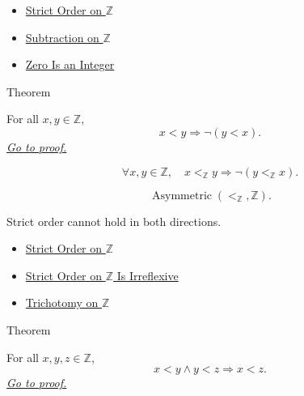 \begin{dependencies}
\begin{itemize}
  \item \hyperref[def:strict-order-on-z]{Strict Order on $\mathbb{Z}$}
  \item \hyperref[def:subtraction-on-z]{Subtraction on $\mathbb{Z}$}
  \item \hyperref[thm:zero-is-an-integer]{Zero Is an Integer}
\end{itemize}
\end{dependencies}

\begin{theorembox}{Theorem}
\begin{theorem}
\label{thm:strict-order-on-z-asymmetric}
For all $x,y\in\mathbb{Z}$,
\[
x<y \Longrightarrow \neg(y<x).
\]
\hyperref[prf:strict-order-on-z-asymmetric]{\textit{Go to proof.}}
\end{theorem}
\end{theorembox}

\begin{remark*}
\[
\forall x,y\in\mathbb{Z},\quad
x<_{\mathbb{Z}}y \Longrightarrow \neg(y<_{\mathbb{Z}}x).
\]
\end{remark*}

\begin{remark*}
\[
\operatorname{Asymmetric}(<_{\mathbb{Z}},\mathbb{Z}).
\]
\end{remark*}

\begin{remark*}[Interpretation]
Strict order cannot hold in both directions.
\end{remark*}

\begin{dependencies}
\begin{itemize}
  \item \hyperref[def:strict-order-on-z]{Strict Order on $\mathbb{Z}$}
  \item \hyperref[thm:strict-order-on-z-irreflexive]{Strict Order on $\mathbb{Z}$ Is Irreflexive}
  \item \hyperref[thm:trichotomy-on-z]{Trichotomy on $\mathbb{Z}$}
\end{itemize}
\end{dependencies}

\begin{theorembox}{Theorem}
\begin{theorem}
\label{thm:strict-order-on-z-transitive}
For all $x,y,z\in\mathbb{Z}$,
\[
x<y\land y<z \Longrightarrow x<z.
\]
\hyperref[prf:strict-order-on-z-transitive]{\textit{Go to proof.}}
\end{theorem}
\end{theorembox}

